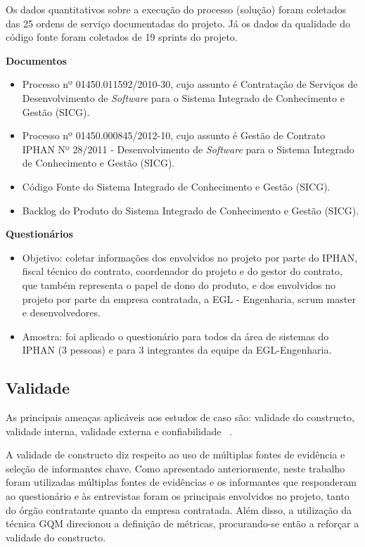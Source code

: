 Os dados quantitativos sobre a execução do processo (solução) foram coletados das 25 ordens de serviço documentadas do projeto. Já os dados da qualidade do código fonte foram coletados de 19 sprints do projeto.

\textbf{Documentos}
\begin{itemize}
\item Processo nº 01450.011592/2010-30, cujo assunto é Contratação de Serviços de Desenvolvimento de \textit{Software} para o Sistema Integrado de Conhecimento e Gestão (SICG). 
\item Processo nº 01450.000845/2012-10, cujo assunto é Gestão de Contrato IPHAN Nº 28/2011 - Desenvolvimento de \textit{Software} para o Sistema Integrado de Conhecimento e Gestão (SICG). 
\item Código Fonte do Sistema Integrado de Conhecimento e Gestão (SICG).
\item Backlog do Produto do Sistema Integrado de Conhecimento e Gestão (SICG).
\end{itemize}

\textbf{Questionários}
\begin{itemize}
\item Objetivo: coletar informações dos envolvidos no projeto por parte do IPHAN,  fiscal técnico do contrato, coordenador do projeto e do gestor do contrato, que também representa o papel de dono do produto, e dos envolvidos no projeto por parte da empresa contratada, a EGL - Engenharia, scrum master e desenvolvedores. 
\item Amostra: foi aplicado o questionário para todos da área de sistemas do IPHAN (3 pessoas) e para 3 integrantes da equipe da EGL-Engenharia.
\end{itemize}

\subsection[Validade]{Validade}

As principais ameaças aplicáveis aos estudos de caso 
são: validade do constructo, validade interna, validade externa e confiabilidade ~\cite{yin}.

A validade de constructo diz respeito ao uso de múltiplas fontes de evidência e seleção de informantes chave. Como apresentado anteriormente, neste trabalho foram utilizadas múltiplas fontes de evidências e os informantes que responderam ao questionário e às entrevistas foram os principais envolvidos no projeto, tanto do órgão contratante quanto da empresa contratada. Além disso, a utilização da técnica GQM direcionou a definição de métricas, procurando-se então a reforçar a validade do constructo.

